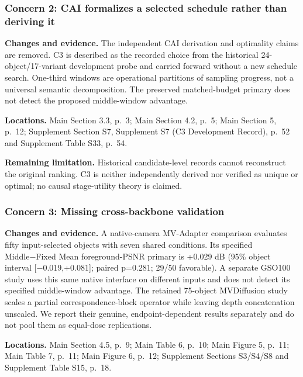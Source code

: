\documentclass[
  10pt,
]{article}
\begin{document}
\hypertarget{concern-2-cai-formalizes-a-selected-schedule-rather-than-deriving-it}{%
\subsubsection{Concern 2: CAI formalizes a selected schedule rather than
deriving
it}\label{concern-2-cai-formalizes-a-selected-schedule-rather-than-deriving-it}}

\textbf{Changes and evidence.} The independent CAI derivation and
optimality claims are removed. C3 is described as the recorded choice
from the historical 24-object/17-variant development probe and carried
forward without a new schedule search. One-third windows are operational
partitions of sampling progress, not a universal semantic decomposition.
The preserved matched-budget primary does not detect the proposed
middle-window advantage.

\textbf{Locations.} Main Section 3.3, p.~3; Main Section 4.2, p.~5; Main
Section 5, p.~12; Supplement Section S7, Supplement S7 (C3 Development
Record), p.~52 and Supplement Table S33, p.~54.

\textbf{Remaining limitation.} Historical candidate-level records cannot
reconstruct the original ranking. C3 is neither independently derived
nor verified as unique or optimal; no causal stage-utility theory is
claimed.

\hypertarget{concern-3-missing-cross-backbone-validation}{%
\subsubsection{Concern 3: Missing cross-backbone
validation}\label{concern-3-missing-cross-backbone-validation}}

\textbf{Changes and evidence.} A native-camera MV-Adapter comparison
evaluates fifty input-selected objects with seven shared conditions. Its
specified Middle−Fixed Mean foreground-PSNR primary is +0.029 dB (95\%
object interval {[}−0.019,+0.081{]}; paired p=0.281; 29/50 favorable). A
separate GSO100 study uses this same native interface on different
inputs and does not detect its specified middle-window advantage. The
retained 75-object MVDiffusion study scales a partial
correspondence-block operator while leaving depth concatenation
unscaled. We report their genuine, endpoint-dependent results separately
and do not pool them as equal-dose replications.

\textbf{Locations.} Main Section 4.5, p.~9; Main Table 6, p.~10; Main
Figure 5, p.~11; Main Table 7, p.~11; Main Figure 6, p.~12; Supplement
Sections S3/S4/S8 and Supplement Table S15, p.~18.
\end{document}
